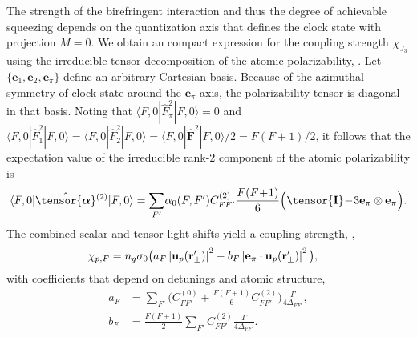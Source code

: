 \documentclass[aps,pra,twocolumn]{revtex4-1} %
\newcommand{\unittens}{\tensor{\mathbf{I}}}
\newcommand{\poltens}{\hat{\tensor{\boldsymbol{\alpha}}}}
\newcommand{\qaxis}{\mathbf{e}_\pi}
\newcommand{\chieff}{\chi_{J_3}}
\begin{document}
The strength of the birefringent interaction and thus the degree of achievable squeezing depends on the quantization axis that defines the clock state with projection $M=0$.  We obtain an compact expression for the coupling strength $\chieff$ using the irreducible tensor decomposition of the atomic polarizability, .  
Let $\{\mathbf{e}_1,\mathbf{e}_2, \mathbf{e}_\pi\}$ define an arbitrary Cartesian basis.  Because of the azimuthal symmetry of clock state around the $\qaxis$-axis, the polarizability tensor is diagonal in that basis.  
Noting that $\langle F,0 | \hat{F}_{\pi}^2| F,0 \rangle =0$ and $\langle F,0 | \hat{F}_{1}^2| F,0 \rangle = \langle F,0 | \hat{F}_{2}^2| F,0 \rangle = \langle F,0 | \hat{\mathbf{F}}^2| F,0 \rangle /2 =F(F+1)/2$, it follows that the expectation value of the irreducible rank-2 component of the atomic polarizability is
	\begin{align} \label{Eq::CouplingAngleMagic}
		\langle F,0 | \poltens \phantom{}^{(2)}| F,0 \rangle = \sum_{F'}\! \alpha_0(F,F') C^{(2)}_{FF'} \frac{F(F\!+\!1)}{6} \Big( \unittens \!-\! 3\qaxis \otimes \qaxis \Big).
	\end{align}
The combined scalar and tensor light shifts yield a coupling strength, ,
	\begin{align}
		\chi_{p,F} &  = n_g \sigma_0 \big(  a_{F} \left|\mathbf{u}_p(\mathbf{r}'_\perp)\right|^2 - b_{F} \left|\mathbf{e}_\pi \cdot \mathbf{u}_p(\mathbf{r}'_\perp)\right|^2 \big), \label{Eq::ClockStateCoupling}
	\end{align}
with coefficients that depend on detunings and atomic structure,
	\begin{align}
		a_F &= \sum_{F'}  \Big(C^{(0)}_{FF'} + \frac{F(F+1)}{6} C^{(2)}_{FF'} \Big) \frac{\Gamma}{4 \Delta_{FF'}},\\
		b_F &= \frac{F(F+1)}{2}\sum_{F'} C^{(2)}_{FF'}  \frac{\Gamma}{4 \Delta_{FF'}}.
	\end{align}
\end{document}
